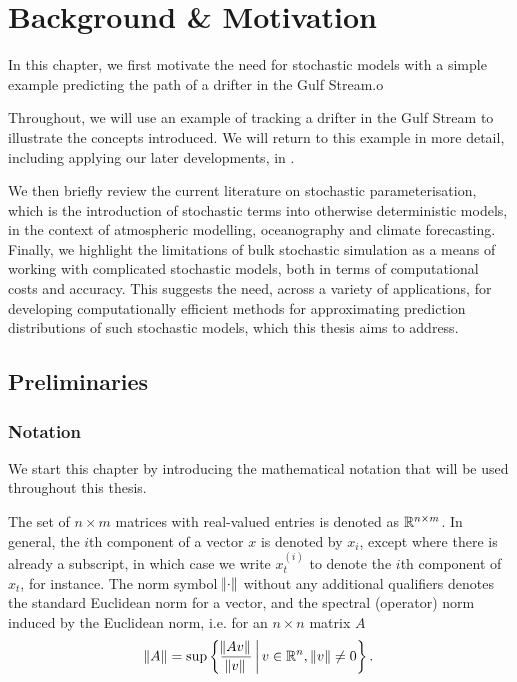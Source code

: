 
\chapter{Background \& Motivation}
In this chapter, we first motivate the need for stochastic models with a simple example predicting the path of a drifter in the Gulf Stream.o

Throughout, we will use an example of tracking a drifter in the Gulf Stream to illustrate the concepts introduced.
We will return to this example in more detail, including applying our later developments, in .

We then briefly review the current literature on stochastic parameterisation, which is the introduction of stochastic terms into otherwise deterministic models, in the context of atmospheric modelling, oceanography and climate forecasting.
Finally, we highlight the limitations of bulk stochastic simulation as a means of working with complicated stochastic models, both in terms of computational costs and accuracy.
This suggests the need, across a variety of applications, for developing computationally efficient methods for approximating prediction distributions of such stochastic models, which this thesis aims to address.


\section{Preliminaries}
\subsection{Notation}
We start this chapter by introducing the mathematical notation that will be used throughout this thesis.

The set of \(n \times m\) matrices with real-valued entries is denoted as \(\mathbb{R}^{n\times m}\).
In general, the \(i\)th component of a vector \(x\) is denoted by \(x_{i}\), except where there is already a subscript, in which case we write \(x_t^{(i)}\) to denote the \(i\)th component of \(x_t\), for instance.
The norm symbol \(\norm{\cdot}\) without any additional qualifiers denotes the standard Euclidean norm for a vector, and the spectral (operator) norm induced by the Euclidean norm, i.e. for an \(n \times n\) matrix \(A\)
\[
	\norm{A} = \sup\left\{\frac{\norm{Av}}{\norm{v}}\,\middle|\,v \in \mathbb{R}^n, \, \norm{v} \neq 0\right\}.
\]



